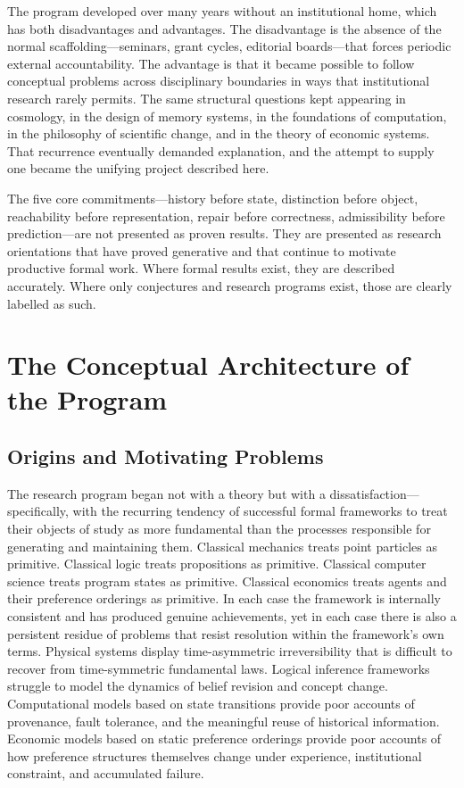 \documentclass[11pt, oneside]{book}
\theoremstyle{definition}
\theoremstyle{remark}
\begin{document}
The program developed over many years without an institutional home, which has both disadvantages and advantages. The disadvantage is the absence of the normal scaffolding—seminars, grant cycles, editorial boards—that forces periodic external accountability. The advantage is that it became possible to follow conceptual problems across disciplinary boundaries in ways that institutional research rarely permits. The same structural questions kept appearing in cosmology, in the design of memory systems, in the foundations of computation, in the philosophy of scientific change, and in the theory of economic systems. That recurrence eventually demanded explanation, and the attempt to supply one became the unifying project described here.

The five core commitments—history before state, distinction before object, reachability before representation, repair before correctness, admissibility before prediction—are not presented as proven results. They are presented as research orientations that have proved generative and that continue to motivate productive formal work. Where formal results exist, they are described accurately. Where only conjectures and research programs exist, those are clearly labelled as such.

\mainmatter

\chapter{The Conceptual Architecture of the Program}

\section{Origins and Motivating Problems}

The research program began not with a theory but with a dissatisfaction—specifically, with the recurring tendency of successful formal frameworks to treat their objects of study as more fundamental than the processes responsible for generating and maintaining them. Classical mechanics treats point particles as primitive. Classical logic treats propositions as primitive. Classical computer science treats program states as primitive. Classical economics treats agents and their preference orderings as primitive. In each case the framework is internally consistent and has produced genuine achievements, yet in each case there is also a persistent residue of problems that resist resolution within the framework's own terms. Physical systems display time-asymmetric irreversibility that is difficult to recover from time-symmetric fundamental laws. Logical inference frameworks struggle to model the dynamics of belief revision and concept change. Computational models based on state transitions provide poor accounts of provenance, fault tolerance, and the meaningful reuse of historical information. Economic models based on static preference orderings provide poor accounts of how preference structures themselves change under experience, institutional constraint, and accumulated failure.
\end{document}
